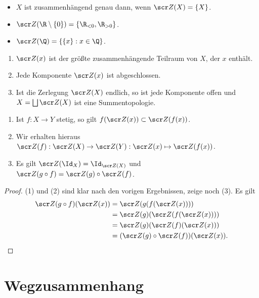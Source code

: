 \begin{ex}
	\begin{itemize}
		\item
			$X$ ist zusammenhängend genau dann, wenn $\scr Z(X) = \{X\}$.
		\item
			$\scr Z(\R \setminus \{0\}) = \{ \R_{<0}, \R_{>0} \}$.
		\item
			$\scr Z(\Q) = \{ \{x\} : x \in \Q \}$.
	\end{itemize}
\end{ex}

\begin{st}
	\begin{enumerate}[(1)]
		\item
			$\scr Z(x)$ ist der größte zusammenhängende Teilraum von $X$, der $x$ enthält.
		\item
			Jede Komponente $\scr Z(x)$ ist abgeschlossen.
		\item
			Ist die Zerlegung $\scr Z(X)$ endlich, so ist jede Komponente offen und $X = \bigdunion \scr Z(X)$ ist eine Summentopologie.
	\end{enumerate}
\end{st}

\begin{st}
	\begin{enumerate}[(1)]
		\item
			Ist $f: X \to Y$ stetig, so gilt $f(\scr Z(x)) \subset \scr Z(f(x))$.
		\item
			Wir erhalten hieraus $\scr Z(f): \scr Z(X) \to \scr Z(Y): \scr Z(x) \mapsto \scr Z(f(x))$.
		\item
			Es gilt $\scr Z(\Id_X) = \Id_{\scr Z(X)}$ und $\scr Z(g\circ f) = \scr Z(g) \circ \scr Z(f)$.
	\end{enumerate}
	\begin{proof}
		(1) und (2) sind klar nach den vorigen Ergebnissen, zeige noch (3).
		Es gilt
		\begin{align*}
			\scr Z(g\circ f) (\scr Z(x))
			&= \scr Z(g(f(\scr Z(x)))) \\
			&= \scr Z(g) (\scr Z(f(\scr Z(x)))) \\
			&= \scr Z(g)(\scr Z(f)(\scr Z(x))) \\
			&= (\scr Z(g) \circ \scr Z(f)) (\scr Z(x)).
		\end{align*}
	\end{proof}
\end{st}


\section{Wegzusammenhang}

